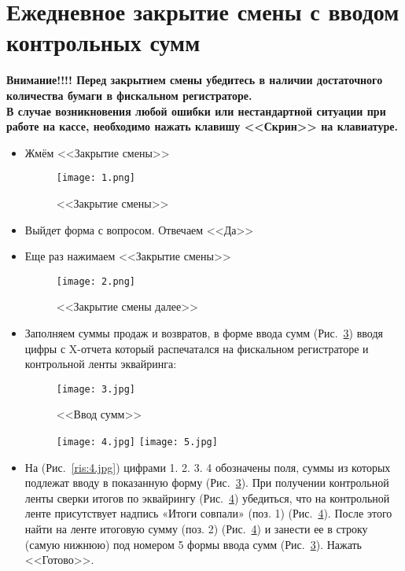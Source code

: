\section{Ежедневное закрытие смены с вводом контрольных сумм}
	\begin{warning}
		\textbf{Внимание!!!! Перед закрытием смены убедитесь в наличии достаточного количества бумаги в фискальном регистраторе. \\
		В случае возникновения любой ошибки или нестандартной ситуации при работе на кассе, необходимо нажать клавишу <<Скрин>> на клавиатуре.}
	\end{warning}

	

\begin{itemize}
	\item Жмём <<Закрытие смены>>
	
	
	\begin{figure}[H]
		\texttt{[image: 1.png]}
		\caption{<<Закрытие смены>>}
		\label{ris:1.png}
	\end{figure}
	
	\item Выйдет форма с вопросом. Отвечаем <<Да>>
	\item Еще раз нажимаем <<Закрытие смены>>
	\begin{figure}[H]
		\texttt{[image: 2.png]}
		\caption{<<Закрытие смены далее>>}
		\label{ris:2.png}
	\end{figure}
 	\item Заполняем суммы продаж и возвратов, в форме ввода сумм (Рис.~\ref{ris:3.jpg}) вводя цифры с X-отчета который распечатался на фискальном регистраторе и контрольной ленты эквайринга:
	\begin{figure}[H]
 		\texttt{[image: 3.jpg]}
 		\caption{<<Ввод сумм>>}
 		\label{ris:3.jpg}
 	\end{figure}
	\par

	
	\begin{figure}[H]
		  \begin{floatrow}
			   {\texttt{[image: 4.jpg]}\label{ris:4.jpg}}
			   {\texttt{[image: 5.jpg]}\label{ris:5.jpg}}         
		   \end{floatrow}
    \end{figure}
	\par
	
		\item На (Рис.~\ref{ris:4.jpg}) цифрами 1. 2. 3. 4 обозначены поля, суммы из которых подлежат вводу в показанную форму  (Рис.~\ref{ris:3.jpg}). При получении  контрольной ленты сверки итогов по эквайрингу (Рис.~\ref{ris:5.jpg})  убедиться, что на контрольной ленте  присутствует надпись «Итоги совпали» (поз. 1) (Рис.~\ref{ris:5.jpg}). После этого найти на ленте итоговую сумму (поз. 2) (Рис.~\ref{ris:5.jpg}) и занести ее в строку (самую нижнюю) под номером 5 формы ввода сумм (Рис.~\ref{ris:3.jpg}). Нажать <<Готово>>.
		
		
		
\end{itemize}
\newpage
